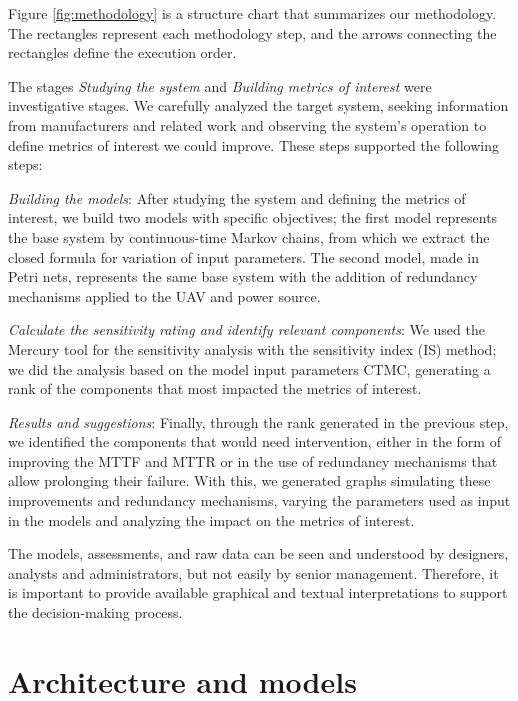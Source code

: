 \documentclass[conference]{IEEEtran}
\begin{document}
Figure \ref{fig:methodology} is a structure chart that summarizes our methodology. The rectangles represent each methodology step, and the arrows connecting the rectangles define the execution order.

The stages \textit{Studying the system} and \textit{Building metrics of interest} were investigative stages. We carefully analyzed the target system, seeking information from manufacturers and related work and observing the system's operation to define metrics of interest we could improve. These steps supported the following steps:

\textit{Building the models}: After studying the system and defining the metrics of interest, we build two models with specific objectives; the first model represents the base system by continuous-time Markov chains, from which we extract the closed formula for variation of input parameters. The second model, made in Petri nets, represents the same base system with the addition of redundancy mechanisms applied to the UAV and power source.

\textit{Calculate the sensitivity rating and identify relevant components}: We used the Mercury tool \citep{maciel2017mercury} for the sensitivity analysis with the sensitivity index (IS) method; we did the analysis based on the model input parameters CTMC, generating a rank of the components that most impacted the metrics of interest.

\textit{Results and suggestions}: Finally, through the rank generated in the previous step, we identified the components that would need intervention, either in the form of improving the MTTF and MTTR or in the use of redundancy mechanisms that allow prolonging their failure. With this, we generated graphs simulating these improvements and redundancy mechanisms, varying the parameters used as input in the models and analyzing the impact on the metrics of interest. 

The models, assessments, and raw data can be seen and understood by designers, analysts and administrators, but not easily by senior management. Therefore, it is important to provide available graphical and textual interpretations to support the decision-making process\citep{melo2021distributed}. 



\section{Architecture and models}\label{sec:model}
\end{document}
